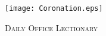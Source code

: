 \fancyhead[RE,LO]{}\fancyhead[RO,LE]{}
\fancyhead[C]{}
\mainmatter
\thispagestyle{empty}
{}
  \begin{center}
   \texttt{[image: Coronation.eps]}
   \par
   \vspace{2ex}
   	\textsc{\Huge{Daily Office Lectionary}}
   \end{center}